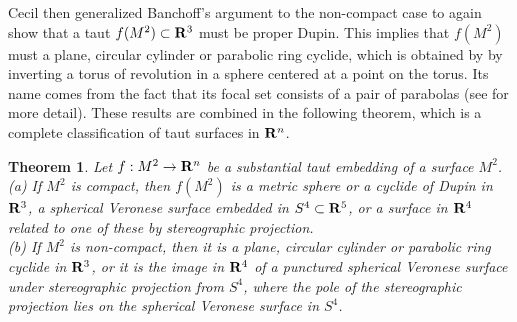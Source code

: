 \documentclass[12pt]{article}
\newtheorem{theorem}{Theorem}[section]
\begin{document}
{Cecil \cite{CecJDG} then generalized Banchoff's argument to
the non-compact case to again show that a taut
$f(M^2) \subset {\bf R}^3$ 
must be proper Dupin.  This implies that $f(M^2)$ must a plane, circular
cylinder or parabolic ring cyclide, which is obtained by
by inverting a torus of revolution in a sphere centered at a point
on the torus.  Its name comes from the fact that its focal set consists
of a pair of parabolas (see \cite[pp. 151--166]{CR7} for more detail).
These results are combined in the
following theorem, which is a complete classification of
taut surfaces in  ${\bf R}^n$.

\begin{theorem}
\label{thm:taut-surfaces}
Let $f:M^2 \rightarrow {\bf R}^n$ be a substantial taut embedding of a
surface $M^2$. \\ 
{\rm (a)} If $M^2$ is compact, then $f(M^2)$ is a metric sphere or
a cyclide of Dupin in ${\bf R}^3$, a spherical Veronese surface embedded in
$S^4 \subset {\bf R}^5$,
or a surface
in ${\bf R}^4$ related to one of these by 
stereographic projection.\\
{\rm (b)} If $M^2$ is non-compact, then it is a plane, circular cylinder
or parabolic ring cyclide in ${\bf R}^3$, or it is the image in
${\bf R}^4$ of a punctured spherical Veronese surface under
stereographic projection from $S^4$, where the pole of the stereographic projection lies on
the spherical Veronese surface in $S^4$.
\end{theorem}



}
\end{document}
